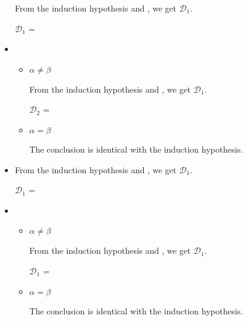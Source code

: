 \begin{itemize}
	      From the induction hypothesis and \TIns, we get $\mathcal{D}_1$.

	      $\mathcal{D}_1$ = 
	      {}

	\item \TCsp

	      \begin{itemize}

		      \item $\alpha \neq \beta$

		            From the induction hypothesis and \TCsp, we get $\mathcal{D}_1$.

		            $\mathcal{D}_2$ = 
		            {}

		      \item $\alpha = \beta$

		            The conclusion is identical with the induction hypothesis.

	      \end{itemize}

	\item \QKAbs

	      From the induction hypothesis and \QKAbs, we get $\mathcal{D}_1$.

	      $\mathcal{D}_1$ = 
	      { \andalso
		       }

	\item \QKCsp

	      \begin{itemize}

		      \item $\alpha \neq \beta$

		            From the induction hypothesis and \QKCsp, we get $\mathcal{D}_1$.

		            $\mathcal{D}_1$ = 
		            {}


		      \item $\alpha = \beta$

		            The conclusion is identical with the induction hypothesis.

	      \end{itemize}


\end{itemize}
